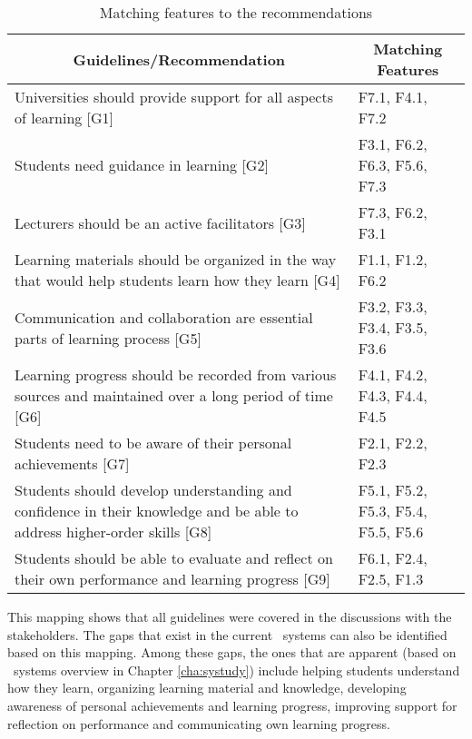 \begin{table}[hb] \small
\centering
    \setlength{\abovecaptionskip}{0pt}
	\caption{Matching features to the recommendations}
    \begin{tabular}{|p{9.8cm}|p{2.6cm}|}
     \hline
     \multicolumn{1}{|c|}{\textbf{Guidelines/Recommendation}} &
     \multicolumn{1}{c|}{\textbf{Matching Features}} \\
     \hline
    Universities should provide support for all aspects of learning [G1] & F7.1,
    F4.1, F7.2 \\ \hline 
    Students need guidance in learning [G2] & F3.1, F6.2, F6.3, F5.6, F7.3
    \\ \hline
    Lecturers should be an active facilitators [G3] & F7.3, F6.2, F3.1 \\ \hline
    Learning materials should be organized in the way that would help students
	learn how they learn [G4] & F1.1, F1.2, F6.2 \\ \hline 
    Communication and collaboration are essential parts of learning process [G5]
    & F3.2, F3.3, F3.4, F3.5, F3.6 \\ \hline 
	Learning progress should be recorded from various sources and maintained
    over a long period of time [G6] & F4.1, F4.2, F4.3, F4.4, F4.5 \\ \hline 
    Students need to be aware of their personal achievements [G7] & F2.1, F2.2,
    F2.3 \\ \hline 
	Students should develop understanding and confidence in their knowledge and
	be able to address higher-order skills [G8] & F5.1, F5.2, F5.3, F5.4, F5.5,
	F5.6 \\	\hline 
	Students should be able to evaluate and reflect on their own performance and
	learning progress [G9] & F6.1, F2.4, F2.5, F1.3 \\ \hline 
    \end{tabular}
    \label{tab:mapping}
\end{table}

This mapping shows that all guidelines were covered in the discussions with the
stakeholders. The gaps that exist in the current \ep~systems can also be
identified based on this mapping. Among these gaps, the ones that are apparent
(based on \ep~systems overview in Chapter \ref{cha:systudy}) include helping
students understand how they learn, organizing learning material and knowledge,
developing awareness of personal achievements and learning progress, improving
support for reflection on performance and communicating own learning progress.

